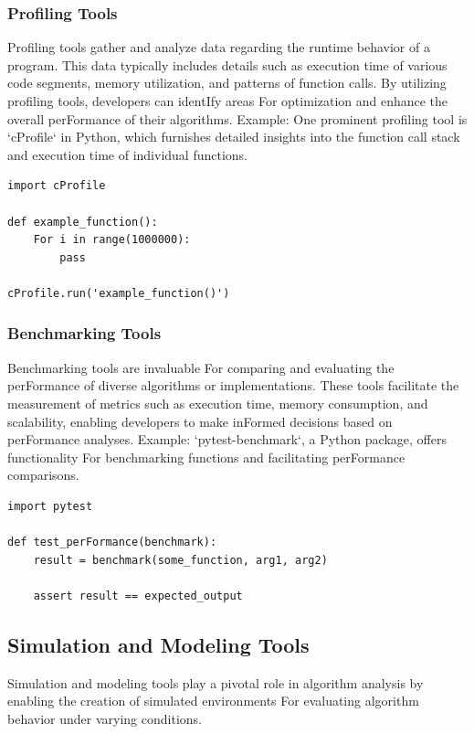 \documentclass[12pt]{book} %
\begin{document}
\subsubsection{Profiling Tools}
Profiling tools gather and analyze data regarding the runtime behavior of a program. This data typically includes details such as execution time of various code segments, memory utilization, and patterns of function calls. By utilizing profiling tools, developers can identIfy areas For optimization and enhance the overall perFormance of their algorithms.
\FloatBarrier
Example: 
\FloatBarrier
One prominent profiling tool is `cProfile` in Python, which furnishes detailed insights into the function call stack and execution time of individual functions.
\FloatBarrier
\begin{verbatim}
import cProfile

def example_function():
    For i in range(1000000):
        pass

cProfile.run('example_function()')
\end{verbatim}
\FloatBarrier
\subsubsection{Benchmarking Tools}
Benchmarking tools are invaluable For comparing and evaluating the perFormance of diverse algorithms or implementations. These tools facilitate the measurement of metrics such as execution time, memory consumption, and scalability, enabling developers to make inFormed decisions based on perFormance analyses.
\FloatBarrier
Example: 
\FloatBarrier
`pytest-benchmark`, a Python package, offers functionality For benchmarking functions and facilitating perFormance comparisons.
\FloatBarrier
\begin{verbatim}
import pytest

def test_perFormance(benchmark):
    result = benchmark(some_function, arg1, arg2)

    assert result == expected_output
\end{verbatim}
\FloatBarrier
\subsection{Simulation and Modeling Tools}

Simulation and modeling tools play a pivotal role in algorithm analysis by enabling the creation of simulated environments For evaluating algorithm behavior under varying conditions.
\end{document}
